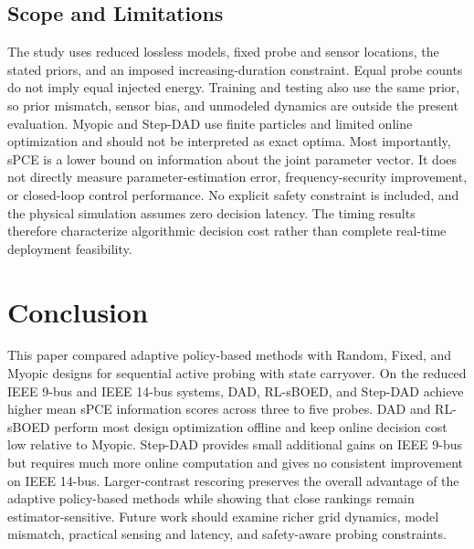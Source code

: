 \documentclass[conference,letterpaper]{IEEEtran}
\begin{document}
\balance
\subsection{Scope and Limitations}
The study uses reduced lossless models, fixed probe and sensor locations, the stated priors, and an imposed increasing-duration constraint. Equal probe counts do not imply equal injected energy. Training and testing also use the same prior, so prior mismatch, sensor bias, and unmodeled dynamics are outside the present evaluation. Myopic and Step-DAD use finite particles and limited online optimization and should not be interpreted as exact optima. Most importantly, sPCE is a lower bound on information about the joint parameter vector. It does not directly measure parameter-estimation error, frequency-security improvement, or closed-loop control performance. No explicit safety constraint is included, and the physical simulation assumes zero decision latency. The timing results therefore characterize algorithmic decision cost rather than complete real-time deployment feasibility.

\section{Conclusion}
This paper compared adaptive policy-based methods with Random, Fixed, and Myopic designs for sequential active probing with state carryover. On the reduced IEEE 9-bus and IEEE 14-bus systems, DAD, RL-sBOED, and Step-DAD achieve higher mean sPCE information scores across three to five probes. DAD and RL-sBOED perform most design optimization offline and keep online decision cost low relative to Myopic. Step-DAD provides small additional gains on IEEE 9-bus but requires much more online computation and gives no consistent improvement on IEEE 14-bus. Larger-contrast rescoring preserves the overall advantage of the adaptive policy-based methods while showing that close rankings remain estimator-sensitive. Future work should examine richer grid dynamics, model mismatch, practical sensing and latency, and safety-aware probing constraints.



\end{document}
